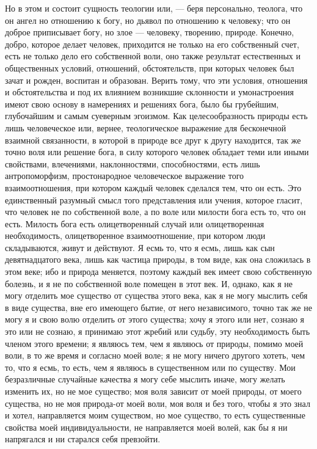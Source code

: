 \documentclass[12pt]{article}
\begin{document}
Но в этом и состоит сущность теологии или, --- беря персонально, теолога, что он ангел но отношению к богу, но дьявол по отношению к человеку; что он доброе приписывает богу, но злое --- человеку, творению, природе. Конечно, добро, которое делает человек, приходится не только на его собственный счет, есть не только дело его собственной воли, оно также результат естественных и общественных условий, отношений, обстоятельств, при которых человек был зачат и рожден, воспитан и образован. Верить тому, что эти условия, отношения и обстоятельства и под их влиянием возникшие склонности и умонастроения имеют свою основу в намерениях и решениях бога, было бы грубейшим, глубочайшим и самым суеверным эгоизмом. Как целесообразность природы есть лишь человеческое или, вернее, теологическое выражение для бесконечной взаимной связанности, в которой в природе все друг к другу находится, так же точно воля или решение бога, в силу которого человек обладает теми или иными свойствами, влечениями, наклонностями, способностями, есть лишь антропоморфизм, простонародное человеческое выражение того взаимоотношения, при котором каждый человек сделался тем, что он есть. Это единственный разумный смысл того представления или учения, которое гласит, что человек не по собственной воле, а по воле или милости бога есть то, что он есть. Милость бога есть олицетворенный случай или олицетворенная необходимость, олицетворенное взаимоотношение, при котором люди складываются, живут и действуют. Я есмь то, что я есмь, лишь как сын девятнадцатого века, лишь как частица природы, в том виде, как она сложилась в этом веке; ибо и природа меняется, поэтому каждый век имеет свою собственную болезнь, и я не по собственной воле помещен в этот век. И, однако, как я не могу отделить мое существо от существа этого века, как я не могу мыслить себя в виде существа, вне его имеющего бытие, от него независимого, точно так же не могу я и свою волю отделить от этого существа; хочу я этого или нет, сознаю я это или не сознаю, я принимаю этот жребий или судьбу, эту необходимость быть членом этого времени; я являюсь тем, чем я являюсь от природы, помимо моей воли, в то же время и согласно моей воле; я не могу ничего другого хотеть, чем то, что я есмь, то есть, чем я являюсь в существенном или по существу. Мои безразличные случайные качества я могу себе мыслить иначе, могу желать изменить их, но не мое существо; моя воля зависит от моей природы, от моего существа, но не моя природа-от моей воли, моя воля и без того, чтобы я это знал и хотел, направляется моим существом, но мое существо, то есть существенные свойства моей индивидуальности, не направляется моей волей, как бы я ни напрягался и ни старался себя превзойти. 
\end{document}
